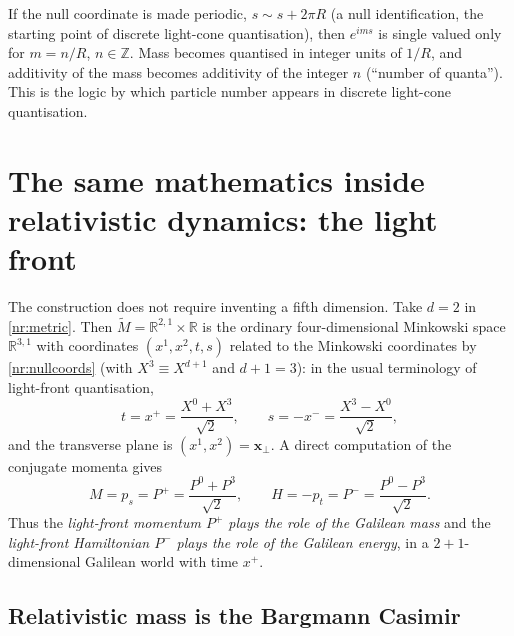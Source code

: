 \begin{nrrem}
If the null coordinate is made periodic, $s\sim s+2\pi R$ (a null
identification, the starting point of discrete light-cone quantisation), then
$e^{ims}$ is single valued only for $m=n/R$, $n\in\mathbb{Z}$. Mass becomes
quantised in integer units of $1/R$, and additivity of the mass becomes
additivity of the integer $n$ (``number of quanta''). This is the logic by
which particle number appears in discrete light-cone quantisation.
\end{nrrem}

\section[Relativistic light-front dynamics]{The same mathematics inside relativistic dynamics: the light front}
\label{sec:nr-lightfront}

The construction does not require inventing a fifth dimension. Take $d=2$ in
\eqref{nr:metric}. Then $\tilde M=\mathbb{R}^{2,1}\times\mathbb{R}$ is the
ordinary four-dimensional Minkowski space $\mathbb{R}^{3,1}$ with coordinates
$(x^1,x^2,t,s)$ related to the Minkowski coordinates by \eqref{nr:nullcoords}
(with $X^3\equiv X^{d+1}$ and $d+1=3$): in the usual terminology of light-front
quantisation,
\[
  t=x^+=\frac{X^0+X^3}{\sqrt2},\qquad s=-x^-=\frac{X^3-X^0}{\sqrt2},
\]
and the transverse plane is $(x^1,x^2)=\mathbf{x}_\perp$. A direct computation
of the conjugate momenta gives
\begin{equation}
  M=p_s=P^+=\frac{P^0+P^3}{\sqrt2},\qquad
  H=-p_t=P^-=\frac{P^0-P^3}{\sqrt2}.
  \label{nr:lfmomenta}
\end{equation}
Thus the \emph{light-front momentum $P^+$ plays the role of the Galilean mass}
and the \emph{light-front Hamiltonian $P^-$ plays the role of the Galilean
energy}, in a $2{+}1$-dimensional Galilean world with time $x^+$.

\subsection{Relativistic mass is the Bargmann Casimir}

